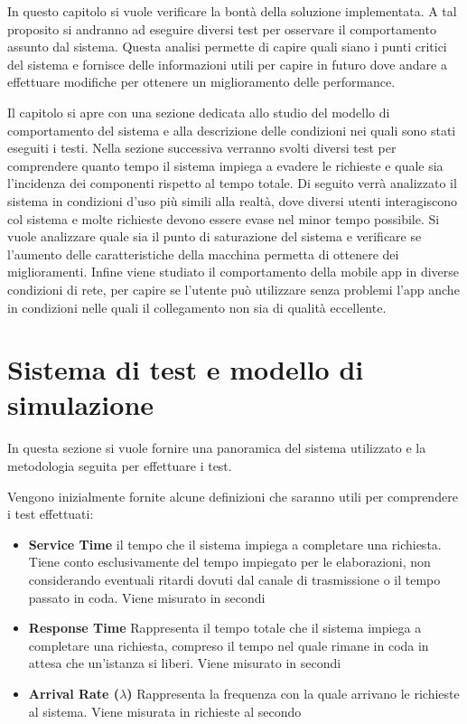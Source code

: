 In questo capitolo si vuole verificare la bontà della soluzione implementata. A tal proposito si andranno ad eseguire diversi test per osservare il comportamento assunto dal sistema. Questa analisi permette di capire quali siano i punti critici del sistema e fornisce delle informazioni utili per capire in futuro dove andare a effettuare modifiche per ottenere un miglioramento delle performance.

Il capitolo si apre con una sezione dedicata allo studio del modello di comportamento del sistema e alla descrizione delle condizioni nei quali sono stati eseguiti i testi. Nella sezione successiva verranno svolti diversi test per comprendere quanto tempo il sistema impiega a evadere le richieste e quale sia l'incidenza dei componenti rispetto al tempo totale. Di seguito verrà analizzato il sistema in condizioni d'uso più simili alla realtà, dove diversi utenti interagiscono col sistema e molte richieste devono essere evase nel minor tempo possibile. Si vuole analizzare quale sia il punto di saturazione del sistema e verificare se l'aumento delle caratteristiche della macchina permetta di ottenere dei miglioramenti. Infine viene studiato il comportamento della mobile app in diverse condizioni di rete, per capire se l'utente può utilizzare senza problemi l'app anche in condizioni nelle quali il collegamento non sia di qualità eccellente.

\section{Sistema di test e modello di simulazione\label{sec:sistema-e-modello}}

In questa sezione si vuole fornire una panoramica del sistema utilizzato e la metodologia seguita per effettuare i test.

Vengono inizialmente fornite alcune definizioni che saranno utili per comprendere i test effettuati:

\begin{itemize}
	\item \textbf{Service Time}
	\upe il tempo che il sistema impiega a completare una richiesta. Tiene conto esclusivamente del tempo impiegato per le elaborazioni, non considerando eventuali ritardi dovuti dal canale di trasmissione o il tempo passato in coda. Viene misurato in secondi
	\item \textbf{Response Time}
	Rappresenta il tempo totale che il sistema impiega a completare una richiesta, compreso il tempo nel quale rimane in coda in attesa che un'istanza si liberi. Viene misurato in secondi
	\item \textbf{Arrival Rate ($ \lambda $)}
	Rappresenta la frequenza con la quale arrivano le richieste al sistema. Viene misurata in richieste al secondo
\end{itemize}

